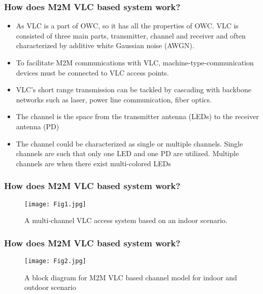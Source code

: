 \documentclass{beamer}
\begin{document}
\begin{frame}
  \frametitle{How does M2M VLC based system work?}
  \begin{block}{}
  \begin{itemize}
      \item As VLC is a part of OWC, so it has all the properties of OWC. VLC is consisted of three main parts, transmitter, channel and receiver and often characterized by additive white Gaussian noise (AWGN).
      \item To facilitate M2M communications with VLC, machine-type-communication devices must be connected to VLC access points.
      \item VLC’s short range transmission can be tackled by cascading with backbone networks such as laser, power line communication, fiber optics.
      \item The channel is the space from the transmitter antenna (LEDs) to the receiver antenna (PD)
      \item The channel could be characterized as single or multiple channels. Single channels are such that only one LED and one PD are utilized. Multiple channels are when there exist multi-colored LEDs
  \end{itemize}
  \end{block}
\end{frame}

\begin{frame}
  \frametitle{How does M2M VLC based system work?}
	\begin{figure} [h]
    \texttt{[image: Fig1.jpg]}
    \caption{A multi-channel VLC access system based on an indoor scenario.}
    \end{figure}	
\end{frame}

\begin{frame}
  \frametitle{How does M2M VLC based system work?}
	\begin{figure} [h]
    \texttt{[image: Fig2.jpg]}
    \caption{A block diagram for M2M VLC based channel model for indoor and outdoor scenario}
    \end{figure}	
\end{frame}
\end{document}
